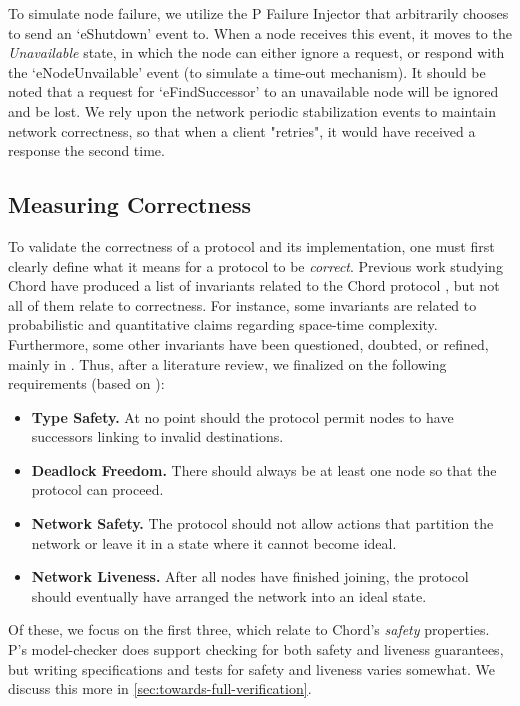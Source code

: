 \documentclass[conference]{IEEEtran}
\begin{document}
To simulate node failure, we utilize the P Failure Injector that arbitrarily chooses to send an `eShutdown' event to. When a node receives this event, it moves to the \textit{Unavailable} state, in which the node can either ignore a request, or respond with the `eNodeUnvailable' event (to simulate a time-out mechanism). It should be noted that a request for `eFindSuccessor' to an unavailable node will be ignored and  be lost. We rely upon the network periodic stabilization events to maintain network correctness, so that when a client "retries", it would have received a response the second time.

\subsection{Measuring Correctness}
\label{sec:measure-correctness}
To validate the correctness of a protocol and its implementation, one must first clearly define what it means for a protocol to be \textit{correct}. Previous work studying Chord have produced a list of invariants related to the Chord protocol \cite{stoica_chord_2003}, but not all of them relate to correctness. For instance, some invariants are related to probabilistic and quantitative claims regarding space-time complexity. Furthermore, some other invariants have been questioned, doubted, or refined, mainly in \cite{zave_using_2012}. Thus, after a literature review, we finalized on the following requirements (based on \cite{zave_reasoning_2017,lund_verification_2019}):
\begin{itemize}
    \item \textbf{Type Safety.} At no point should the protocol permit nodes to have successors linking to invalid destinations.
    \item \textbf{Deadlock Freedom.} There should always be at least one node so that the protocol can proceed.
    \item \textbf{Network Safety.} The protocol should not allow actions that partition the network or leave it in a state where it cannot become ideal.
    \item \textbf{Network Liveness.} After all nodes have finished joining, the protocol should eventually have arranged the network into an ideal state.
\end{itemize}
Of these, we focus on the first three, which relate to Chord's \textit{safety} properties. P's model-checker does support checking for both safety and liveness guarantees, but writing specifications and tests for safety and liveness varies somewhat. We discuss this more in \autoref{sec:towards-full-verification}.
\end{document}
